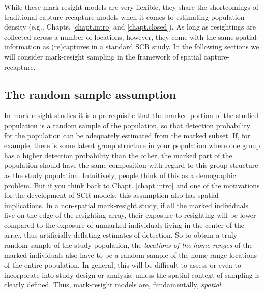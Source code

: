 While these mark-resight models are very flexible, they share the
shortcomings of traditional capture-recapture models when it comes to
estimating population density (e.g., Chapts. \ref{chapt.intro} and
\ref{chapt.closed}). As long as resightings are collected across a
number of locations, however, they come with the same spatial
information as (re)captures in a standard SCR study.  In the following
sections we will consider mark-resight sampling in the framework of
spatial capture-recapture.


\subsection {The random sample assumption}
\label{partialID.sec.random}

In mark-resight studies it is a prerequisite that the marked portion
of the studied population is a random sample of the population, so
that detection probability for the population can be adequately
estimated from the marked subset. If, for example, there is some
latent group structure in your population where one group has a higher
detection probability than the other, the marked part of the
population should have the same composition with regard to this group
structure as the study population. Intuitively, people think of this
as a demographic problem. But if you think back to
Chapt. \ref{chapt.intro} and one of the motivations for the
development of SCR models, this assumption also has spatial
implications. In a non-spatial mark-resight study, if all the
marked individuals live on the edge of the resighting array, their
exposure to resighting will be lower compared to the exposure of
unmarked individuals living in the center of the array,
thus artificially deflating estimates of detection. So to obtain a
truly random sample of the study population, the \emph{locations of
  the home ranges} of the marked individuals also have to be a random
sample of the home range locations of the entire population.  In
general, this will be difficult to assess or even to incorporate into
study design or analysis, unless the spatial context of sampling is
clearly defined.
Thus, mark-resight models are, fundamentally, {\it spatial}.

